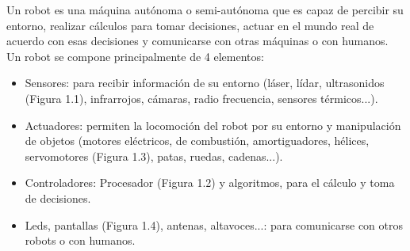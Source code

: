 Un robot es una máquina autónoma o semi-autónoma que es capaz de percibir su entorno, realizar cálculos para tomar decisiones, actuar en el mundo real de acuerdo con esas decisiones y comunicarse con otras máquinas o con humanos. Un robot se compone principalmente de 4 elementos:
\begin{itemize}
  \item Sensores: para recibir información de su entorno (láser, lídar, ultrasonidos (Figura 1.1), infrarrojos, cámaras, radio frecuencia, sensores térmicos...). 
   
  \item Actuadores:  permiten la locomoción del robot por su entorno y manipulación de objetos (motores eléctricos, de combustión, amortiguadores, hélices, servomotores (Figura 1.3), patas, ruedas, cadenas...). 
  

  \item  Controladores: Procesador (Figura 1.2) y algoritmos, para el cálculo y toma de decisiones. 
 
  \item Leds, pantallas (Figura 1.4), antenas, altavoces...: para comunicarse con otros robots o con humanos.
\end{itemize}
